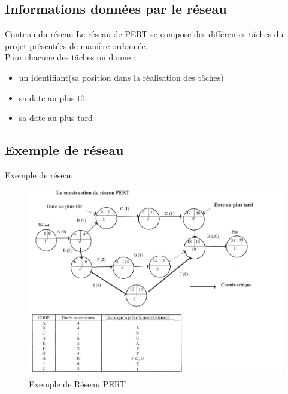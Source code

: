 \documentclass[handout]{beamer}
\begin{document}
\subsection{Informations données par le réseau}

\begin{frame}{Contenu du réseau}
    Le réseau de PERT se compose des différentes tâches du projet présentées de         manière ordonnée.\\
    \pause
    \vspace{\baselineskip}
    Pour chacune des tâches on donne :
    \begin{itemize}
        \item {   
        un identifiant(sa position dans la réalisation des tâches)
        }
        \item{
        sa date au plus tôt
        }
        \item{
        sa date au plus tard
        }


  \end{itemize}
\end{frame}

\subsection{Exemple de réseau}
\begin{frame}{Exemple de réseau}
    \begin{figure}
    \centering
    \includegraphics[scale=0.20]{pert.png}
    \caption{Exemple de Réseau PERT}
    \label{fig:PERT}
    \end{figure}
\end{frame}
\end{document}
